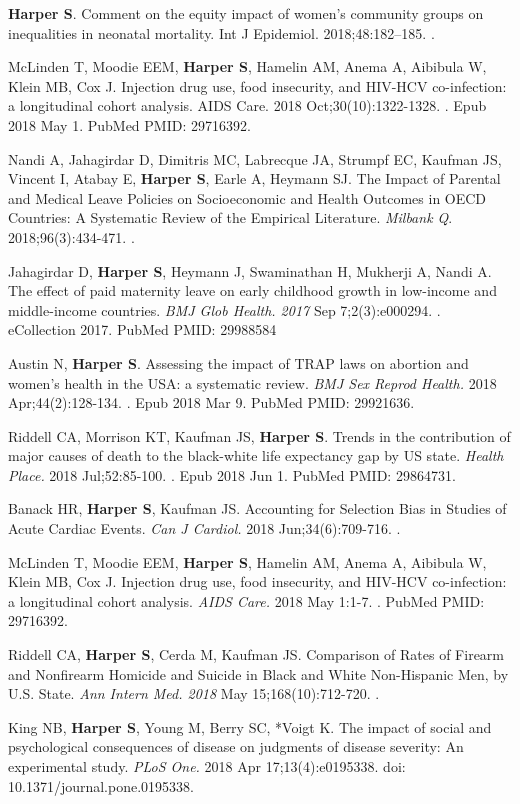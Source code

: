\documentclass[
  letterpaper,
  DIV=11,
  numbers=noendperiod]{scrartcl}
\begin{document}
\textbf{Harper S}. Comment on the equity impact of women's community
groups on inequalities in neonatal mortality. Int J Epidemiol.
2018;48:182--185. .

McLinden T, Moodie EEM, \textbf{Harper S}, Hamelin AM, Anema A, Aibibula
W, Klein MB, Cox J. Injection drug use, food insecurity, and HIV-HCV
co-infection: a longitudinal cohort analysis. AIDS Care. 2018
Oct;30(10):1322-1328. . Epub 2018 May 1. PubMed PMID: 29716392.

Nandi A, Jahagirdar D, Dimitris MC, Labrecque JA, Strumpf EC, Kaufman
JS, Vincent I, Atabay E, \textbf{Harper S}, Earle A, Heymann SJ. The
Impact of Parental and Medical Leave Policies on Socioeconomic and
Health Outcomes in OECD Countries: A Systematic Review of the Empirical
Literature. \emph{Milbank Q}. 2018;96(3):434-471. .

Jahagirdar D, \textbf{Harper S}, Heymann J, Swaminathan H, Mukherji A,
Nandi A. The effect of paid maternity leave on early childhood growth in
low-income and middle-income countries. \emph{BMJ Glob Health. 2017} Sep
7;2(3):e000294. . eCollection 2017. PubMed PMID: 29988584

Austin N, \textbf{Harper S}. Assessing the impact of TRAP laws on
abortion and women's health in the USA: a systematic review. \emph{BMJ
Sex Reprod Health.} 2018 Apr;44(2):128-134. . Epub 2018 Mar 9. PubMed
PMID: 29921636.

Riddell CA, Morrison KT, Kaufman JS, \textbf{Harper S}. Trends in the
contribution of major causes of death to the black-white life expectancy
gap by US state. \emph{Health Place.} 2018 Jul;52:85-100. . Epub 2018
Jun 1. PubMed PMID: 29864731.

Banack HR, \textbf{Harper S}, Kaufman JS. Accounting for Selection Bias
in Studies of Acute Cardiac Events. \emph{Can J Cardiol.} 2018
Jun;34(6):709-716. .

McLinden T, Moodie EEM, \textbf{Harper S}, Hamelin AM, Anema A, Aibibula
W, Klein MB, Cox J. Injection drug use, food insecurity, and HIV-HCV
co-infection: a longitudinal cohort analysis. \emph{AIDS Care.} 2018 May
1:1-7. . PubMed PMID: 29716392.

Riddell CA, \textbf{Harper S}, Cerda M, Kaufman JS. Comparison of Rates
of Firearm and Nonfirearm Homicide and Suicide in Black and White
Non-Hispanic Men, by U.S. State. \emph{Ann Intern Med. 2018} May
15;168(10):712-720. .

King NB, \textbf{Harper S}, Young M, Berry SC, *Voigt K. The impact of
social and psychological consequences of disease on judgments of disease
severity: An experimental study. \emph{PLoS One.} 2018 Apr
17;13(4):e0195338. doi: 10.1371/journal.pone.0195338.
\end{document}
